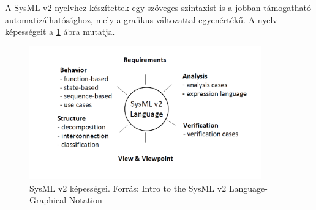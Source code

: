 A SysML v2 nyelvhez készítettek egy szöveges szintaxist is a jobban támogatható automatizálhatósághoz, mely a grafikus változattal egyenértékű.
A nyelv képességeit a \ref{fig:v2_mapping} ábra mutatja.

\begin{figure}
    \centering
    \includegraphics[width=100mm, keepaspectratio]{figures/v2_capabilities.png}
    \caption{SysML v2 képességei. Forrás: Intro to the SysML v2 Language-Graphical Notation}
    \label{fig:v2_mapping}
\end{figure}